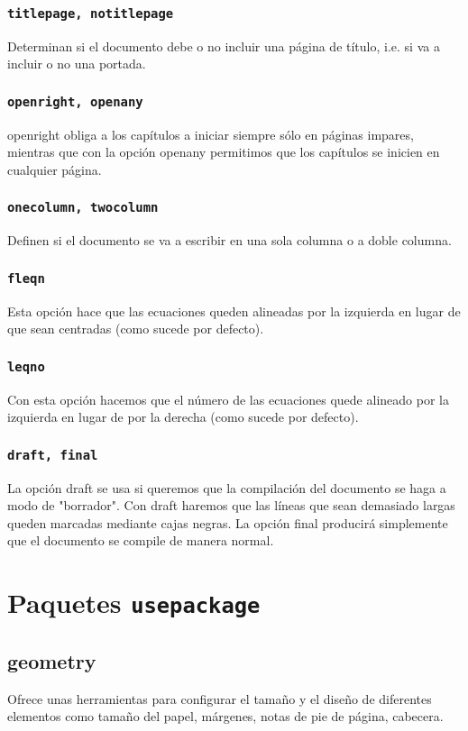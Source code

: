 \subsubsection{\texttt{titlepage, notitlepage}} Determinan si el documento debe o no incluir una página de título, i.e. si va a incluir o no una portada.
\subsubsection{\texttt{openright, openany}} openright obliga a los capítulos a iniciar siempre sólo en páginas impares, mientras que con la opción openany permitimos que los capítulos se inicien en cualquier página.
\subsubsection{\texttt{onecolumn, twocolumn}} Definen si el documento se va a escribir en una sola columna o a doble columna.

\subsubsection{\texttt{fleqn}} Esta opción hace que las ecuaciones queden alineadas por la izquierda en lugar de que sean centradas (como sucede por defecto).
\subsubsection{\texttt{leqno}} Con esta opción hacemos que el número de las ecuaciones quede alineado por la izquierda en lugar de por la derecha (como sucede por defecto).
\subsubsection{\texttt{draft, final}} La opción draft se usa si queremos que la compilación del documento se haga a modo de "borrador". Con draft haremos que las líneas que sean demasiado largas queden marcadas mediante cajas negras. La opción final producirá simplemente que el documento se compile de manera normal.

\section{Paquetes \texttt{usepackage}}

\subsection{geometry}
Ofrece unas herramientas para configurar el tamaño y el diseño de diferentes elementos como tamaño del papel, márgenes, notas de pie de página, cabecera. \\\

